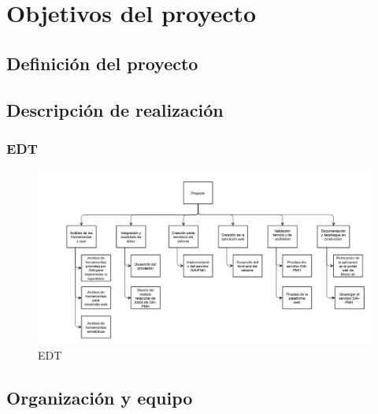 \chapter{Objetivos del proyecto}

\section{Definición del proyecto}





\section{Descripción de realización}





\subsection{EDT}

\begin{figure}[!htp]
	\centering
	\includegraphics[angle=-90, scale=.5]{fig/edt}
	\caption{EDT}
\end{figure}



\section{Organización y equipo}




